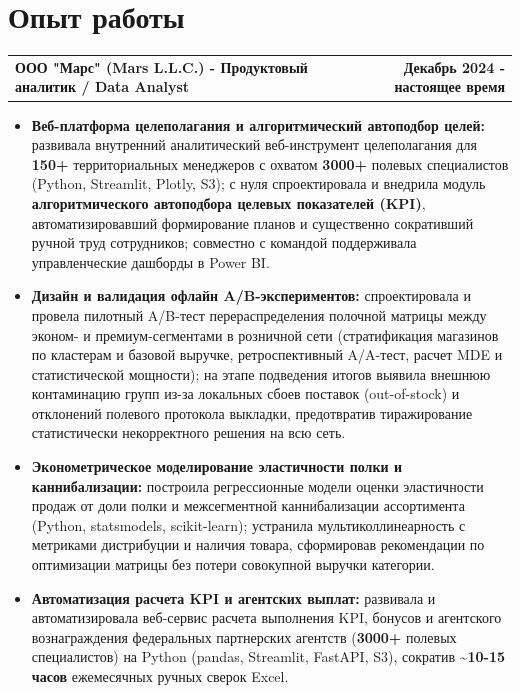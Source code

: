 \documentclass[a4paper,10pt]{article}
\begin{document}
\section{Опыт работы}
\begin{tabularx}{\linewidth}{@{} X r @{}}
\textbf{ООО "Марс" (Mars L.L.C.) - Продуктовый аналитик / Data Analyst} & \textbf{Декабрь 2024 - настоящее время} \\
\end{tabularx}
\vspace{2.5pt}
\begin{itemize}[itemsep=3pt, parsep=0pt, topsep=0pt, leftmargin=1.3em, label=\footnotesize$\bullet$]
    \item \textbf{Веб-платформа целеполагания и алгоритмический автоподбор целей:} развивала внутренний аналитический веб-инструмент целеполагания для \textbf{150+} территориальных менеджеров с охватом \textbf{3000+} полевых специалистов (Python, Streamlit, Plotly, S3); с нуля спроектировала и внедрила модуль \textbf{алгоритмического автоподбора целевых показателей (KPI)}, автоматизировавший формирование планов и существенно сокративший ручной труд сотрудников; совместно с командой поддерживала управленческие дашборды в Power BI.
    \item \textbf{Дизайн и валидация офлайн A/B-экспериментов:} спроектировала и провела пилотный A/B-тест перераспределения полочной матрицы между эконом- и премиум-сегментами в розничной сети (стратификация магазинов по кластерам и базовой выручке, ретроспективный A/A-тест, расчет MDE и статистической мощности); на этапе подведения итогов выявила внешнюю контаминацию групп из-за локальных сбоев поставок (out-of-stock) и отклонений полевого протокола выкладки, предотвратив тиражирование статистически некорректного решения на всю сеть.
    \item \textbf{Эконометрическое моделирование эластичности полки и каннибализации:} построила регрессионные модели оценки эластичности продаж от доли полки и межсегментной каннибализации ассортимента (Python, statsmodels, scikit-learn); устранила мультиколлинеарность с метриками дистрибуции и наличия товара, сформировав рекомендации по оптимизации матрицы без потери совокупной выручки категории.
    \item \textbf{Автоматизация расчета KPI и агентских выплат:} развивала и автоматизировала веб-сервис расчета выполнения KPI, бонусов и агентского вознаграждения федеральных партнерских агентств (\textbf{3000+} полевых специалистов) на Python (pandas, Streamlit, FastAPI, S3), сократив \textbf{\textasciitilde10-15 часов} ежемесячных ручных сверок Excel.
\end{itemize}
\end{document}
